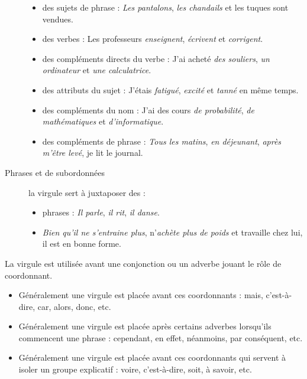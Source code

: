 \documentclass[10pt, french]{article}
\begin{document}
\begin{multicols*}{2}
\begin{definitionNOHFILL}[La virgule]
\begin{definitionNOHFILLpropos}[La juxtaposition]
\begin{description}
		\begin{itemize}
		\item	des sujets de phrase : \textit{Les pantalons}, \textit{les chandails} et les tuques sont vendues.
		\item	des verbes : Les professeurs \textit{enseignent}, \textit{écrivent} et \textit{corrigent}.
		\item	des compléments directs du verbe : J'ai acheté \textit{des souliers}, \textit{un ordinateur} et \textit{une calculatrice}.
		\item	des attributs du sujet : J'étais \textit{fatigué}, \textit{excité} et \textit{tanné} en même temps.
		\item	des compléments du nom : J'ai des cours \textit{de probabilité}, \textit{de mathématiques} et \textit{d'informatique}.
		\item	des compléments de phrase : \textit{Tous les matins}, \textit{en déjeunant}, \textit{après m'être levé}, je lit le journal.
		\end{itemize}
	\item[Phrases et de subordonnées]	la virgule sert à juxtaposer des :
		\begin{itemize}
		\item	phrases : \textit{Il parle}, \textit{il rit}, \textit{il danse}.
		\item	\textit{Bien qu'il ne s'entraine plus}, n'\textit{achète plus de poids} et travaille chez lui, il est en bonne forme.
		\end{itemize}			
\end{description}
\end{definitionNOHFILLpropos}
\begin{definitionNOHFILLpropos}[La coordination]
La virgule est utilisée avant une conjonction ou un adverbe jouant le rôle de coordonnant.	\\

\begin{itemize}
	\item	Généralement une virgule est placée avant ces coordonnants : mais, c'est-à-dire, car, alors, donc, etc.
	\item	Généralement une virgule est placée après certains adverbes lorsqu'ils commencent une phrase : cependant, en effet, néanmoins, par conséquent, etc.
	\item	Généralement une virgule est placée avant ces coordonnants qui servent à isoler un groupe explicatif : voire, c'est-à-dire, soit, à savoir, etc.
\end{itemize}


\end{definitionNOHFILLpropos}
\end{definitionNOHFILL}
\end{multicols*}
\end{document}
